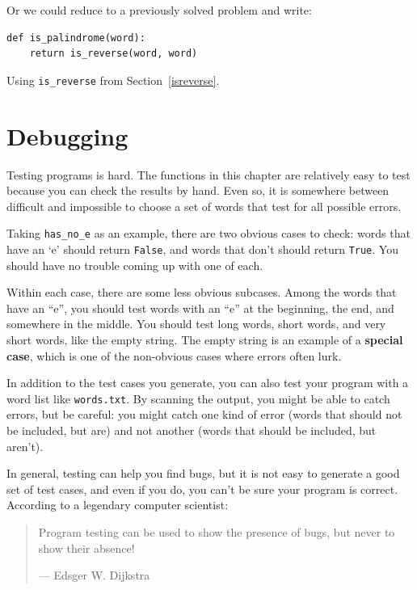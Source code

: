 \documentclass[10pt]{book}
\begin{document}
Or we could reduce to a previously solved
problem and write:

\begin{verbatim}
def is_palindrome(word):
    return is_reverse(word, word)
\end{verbatim}
%
Using \verb"is_reverse" from Section~\ref{isreverse}.


\section{Debugging}

Testing programs is hard.  The functions in this chapter are
relatively easy to test because you can check the results by hand.
Even so, it is somewhere between difficult and impossible to choose a
set of words that test for all possible errors.

Taking \verb"has_no_e" as an example, there are two obvious
cases to check: words that have an `e' should return {\tt False}, and
words that don't should return {\tt True}.  You should have no
trouble coming up with one of each.

Within each case, there are some less obvious subcases.  Among the
words that have an ``e'', you should test words with an ``e'' at the
beginning, the end, and somewhere in the middle.  You should test long
words, short words, and very short words, like the empty string.  The
empty string is an example of a {\bf special case}, which is one of
the non-obvious cases where errors often lurk.

In addition to the test cases you generate, you can also test
your program with a word list like {\tt words.txt}.  By scanning
the output, you might be able to catch errors, but be careful:
you might catch one kind of error (words that should not be
included, but are) and not another (words that should be included,
but aren't).

In general, testing can help you find bugs, but it is not easy to
generate a good set of test cases, and even if you do, you can't
be sure your program is correct.
According to a legendary computer scientist:

\begin{quote}
Program testing can be used to show the presence of bugs, but never to
show their absence!

--- Edsger W. Dijkstra
\end{quote}
\end{document}
